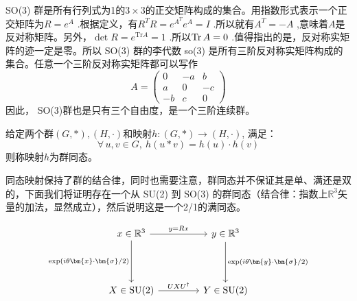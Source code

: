 SO(3) 群是所有行列式为1的$3\times3$的正交矩阵构成的集合。用指数形式表示一个正交矩阵为$R=e^A$ .根据定义，有$R^TR=e^{A^T}e^A=I$ .所以就有$A^T=-A$ ,意味着$A$是反对称矩阵。另外，$\det R=e^{\mathrm{Tr}A}=1$ .所以$\Tr A=0$ .值得指出的是，反对称实矩阵的迹一定是零。所以 SO(3) 群的李代数 so(3) 是所有三阶反对称实矩阵构成的集合。任意一个三阶反对称实矩阵都可以写作
\[A=\begin{pmatrix}0&-a&b\\a&0&-c\\-b&c&0\end{pmatrix}\]
因此， SO(3)群也是只有三个自由度，是一个三阶连续群。

\begin{definition}[群同态]\label{def:g}
给定两个群$(G,\ast),(H,\cdot)$和映射$h:(G,*)\to(H,\cdot)$, 满足：
\[\forall \, u,v \in G, \ h(u*v)=h(u)\cdot h(v)\]
则称映射$h$为群同态。
\end{definition}

同态映射保持了群的结合律，同时也需要注意，群同态并不保证其是单、满还是双的，下面我们将证明存在一个从 SU(2) 到 SO(3) 的群同态（结合律：指数上$\mathbb{R}^3$矢量的加法，显然成立），然后说明这是一个2/1的满同态。

\[
\begin{tikzcd}[row sep=1.5cm, column sep=1.5cm]
x\in\mathbb{R}^3 \arrow[r, "y=Rx"] \arrow[d, "\exp(i\theta\bm{x}\cdot\bm{\sigma}/2)"'] 
    & y\in\mathbb{R}^3 \arrow[d, "\exp(i\theta\bm{y}\cdot\bm{\sigma}/2)"] \\
X\in\text{SU(2)} \arrow[r, "UXU^\dagger"] 
    & Y\in\text{SU(2)}
\end{tikzcd}
\]

